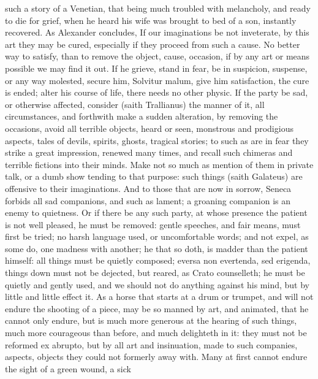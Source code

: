 {such a story of a Venetian, that being much troubled with melancholy,
and ready to die for grief, when he heard his wife was brought to
bed of a son, instantly recovered. As Alexander concludes, If our
imaginations be not inveterate, by this art they may be cured,
especially if they proceed from such a cause. No better way to satisfy,
than to remove the object, cause, occasion, if by any art or means
possible we may find it out. If he grieve, stand in fear, be in
suspicion, suspense, or any way molested, secure him, Solvitur malum,
give him satisfaction, the cure is ended; alter his course of life,
there needs no other physic. If the party be sad, or otherwise
affected, consider (saith Trallianus) the manner of it, all
circumstances, and forthwith make a sudden alteration, by removing the
occasions, avoid all terrible objects, heard or seen, monstrous
and prodigious aspects, tales of devils, spirits, ghosts, tragical
stories; to such as are in fear they strike a great impression, renewed
many times, and recall such chimeras and terrible fictions into their
minds. Make not so much as mention of them in private talk, or a
dumb show tending to that purpose: such things (saith Galateus) are
offensive to their imaginations. And to those that are now in sorrow,
Seneca forbids all sad companions, and such as lament; a groaning
companion is an enemy to quietness. Or if there be any such
party, at whose presence the patient is not well pleased, he must be
removed: gentle speeches, and fair means, must first be tried; no harsh
language used, or uncomfortable words; and not expel, as some do, one
madness with another; he that so doth, is madder than the patient
himself: all things must be quietly composed; eversa non evertenda, sed
erigenda, things down must not be dejected, but reared, as Crato
counselleth;  he must be quietly and gently used, and we should
not do anything against his mind, but by little and little effect it.
As a horse that starts at a drum or trumpet, and will not endure the
shooting of a piece, may be so manned by art, and animated, that he
cannot only endure, but is much more generous at the hearing of such
things, much more courageous than before, and much delighteth in it:
they must not be reformed ex abrupto, but by all art and insinuation,
made to such companies, aspects, objects they could not formerly away
with. Many at first cannot endure the sight of a green wound, a sick
}
